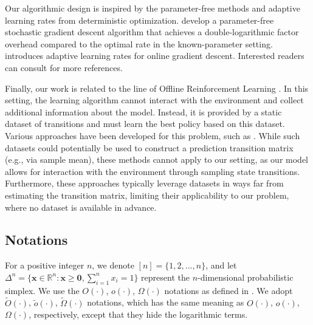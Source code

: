 \documentclass[12pt]{article}
\begin{document}

Our algorithmic design is inspired by the parameter-free methods and adaptive learning rates from deterministic optimization. \cite{carmon2022making} develop a parameter-free stochastic gradient descent algorithm that achieves a double-logarithmic factor overhead compared to the optimal rate in the known-parameter setting. \cite{streeter2010less} introduces adaptive learning rates for online gradient descent. Interested readers can consult \cite{auer2002adaptive,orabona2014simultaneous,cutkosky2018black,orabona2019modern} for more references.


Finally, our work is related to the line of Offline Reinforcement Learning \cite{levine2020offline}. In this setting, the learning algorithm cannot interact with the environment and collect additional information about the model. Instead, it is provided by a static dataset of transitions and must learn the best policy based on this dataset. Various approaches have been developed for this problem, such as \cite{fujimoto2019off,kumar2019stabilizing,kumar2020conservative,agarwal2020optimistic,wu2019behavior}. While such datasets could potentially be used to construct a prediction transition matrix (e.g., via sample mean), these methods cannot apply to our setting, as our model allows for interaction with the environment through sampling state transitions. Furthermore, these approaches typically leverage datasets in ways far from estimating the transition matrix, limiting their applicability to our problem, where no dataset is available in advance.



\subsection{Notations}

For a positive integer $n$, we denote $[n] = \{1,2,...,n\}$, and let $\Delta^n = \{\boldsymbol{x} \in \mathbb{R}^n: \boldsymbol{x} \ge \boldsymbol{0}, \sum_{i=1}^n x_i = 1\}$ represent the $n$-dimensional probabilistic simplex. We use the $O(\cdot)$, $o(\cdot)$, $\Omega(\cdot)$ notations as defined in \cite{cormen2022introduction}. We adopt $\tilde{O}(\cdot)$, $\tilde{o}(\cdot)$, $\tilde{\Omega}(\cdot)$ notations, which has the same meaning as $O(\cdot)$, $o(\cdot)$, $\Omega(\cdot)$, respectively, except that they hide the logarithmic terms.
\end{document}
